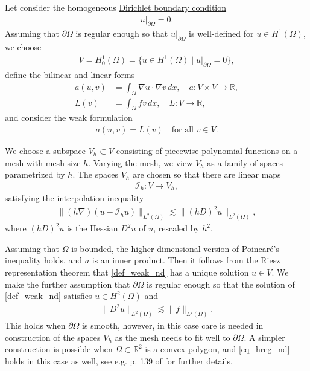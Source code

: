\documentclass[12pt,oneside,final]{amsart}
\def\p{\partial}
\def\R{\mathbb R}
\def\I{\mathcal I}
\begin{document}
Let consider the homogeneous \href{https://en.wikipedia.org/wiki/Dirichlet_boundary_condition}{Dirichlet boundary condition}
    \begin{align}\label{eq_dirichlet}
u|_{\p \Omega} = 0.
    \end{align}
Assuming that $\p \Omega$ is regular enough so that $u|_{\p \Omega}$ is well-defined for $u \in H^1(\Omega)$, we choose
    \begin{align*}
V = H_0^1(\Omega) = \{u \in H^1(\Omega) \mid u|_{\p \Omega} = 0\},
    \end{align*} 
define the bilinear and linear forms 
    \begin{align*}
a(u,v) &= \int_\Omega \nabla u \cdot \nabla v\, dx,
\quad a : V \times V \to \R,
\\
L(v) &= \int_\Omega f v\, dx, \quad L : V \to \R,
    \end{align*}
and consider the weak formulation 
    \begin{align}\label{def_weak_nd}
a(u, v) = L(v) \quad \text{for all $v \in V$}.
    \end{align}

We choose a subspace $V_h \subset V$ consisting of piecewise polynomial functions on a mesh with mesh size $h$. Varying the mesh, we view $V_h$ as a family of spaces parametrized by $h$. The spaces $V_h$ are chosen so that there are linear maps
    \begin{align*}
\I_h : V \to V_h,
    \end{align*}  
satisfying the interpolation inequality 
    \begin{align}\label{eq_interp_nd}
\|(h\nabla)(u - \I_h u)\|_{L^2(\Omega)} \lesssim \|(hD)^2 u\|_{L^2(\Omega)},
    \end{align}
where $(hD)^2 u$ is the Hessian $D^2 u$ of $u$, rescaled by $h^2$.

Assuming that $\Omega$ is bounded, the higher dimensional version of Poincar\'e's inequality holds, and $a$ is an inner product. Then it follows from the Riesz representation theorem that 
\eqref{def_weak_nd} has a unique solution $u \in V$.
We make the further assumption that $\p \Omega$ is regular enough so that the solution of \eqref{def_weak_nd} satisfies $u \in H^2(\Omega)$ and 
    \begin{align}\label{eq_hreg_nd}
\|D^2 u\|_{L^2(\Omega)} \lesssim \|f\|_{L^2(\Omega)}.
    \end{align}
This holds when $\p \Omega$ is smooth, however, in this case care is needed in construction of the spaces $V_h$ as the mesh needs to fit well to $\p \Omega$. A simpler construction is possible when $\Omega \subset \R^2$ is a convex polygon, and \eqref{eq_hreg_nd} holds in this case as well, see e.g. p. 139 of \cite{BS} for further details. 
\end{document}
